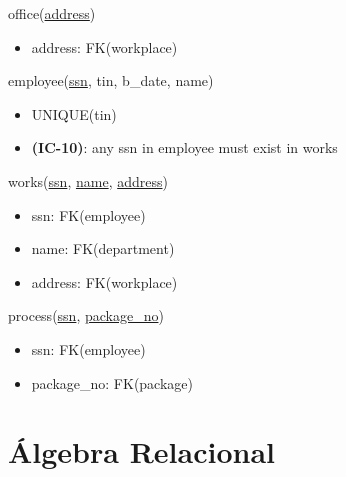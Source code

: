 \documentclass[12pt,a4paper]{article}
\begin{document}
  \vspace*{10pt}
  \noindent
  office(\underline{address})
  \begin{itemize}[nosep]
      \item address: FK(workplace)
  \end{itemize}

  \vspace*{10pt}
  \noindent
  employee(\underline{ssn}, tin, b\_date, name)
  \begin{itemize}[nosep]
      \item UNIQUE(tin)
      \item \textsf{\textbf{(IC-10)}}: any ssn in employee \textsf{must exist} in works
  \end{itemize}

  \vspace*{10pt}
  \noindent
  works(\underline{ssn}, \underline{name}, \underline{address})
  \begin{itemize}[nosep]
      \item ssn: FK(employee)
      \item name: FK(department)
      \item address: FK(workplace)
  \end{itemize}

  \vspace*{10pt}
  \noindent
  process(\underline{ssn}, \underline{package\_no})
  \begin{itemize}[nosep]
      \item ssn: FK(employee)
      \item package\_no: FK(package)
  \end{itemize}
  \sffamily

  \section*{Álgebra Relacional}
\end{document}
